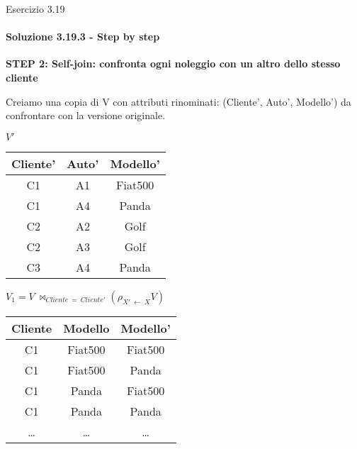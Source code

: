 \begin{frame}{Esercizio 3.19}
    \framesubtitle{Soluzione 3.19.3 - Step by step}
    \vspace*{-1cm}

    {\small \textbf{STEP 2: Self-join: confronta ogni noleggio con un altro dello stesso cliente}}

    Creiamo una copia di V con attributi rinominati: (Cliente', Auto', Modello') da confrontare con la versione originale.
    
    \begin{minipage}{.45\textwidth}
    \centering
    $V'$
    
    \begin{tabular}{|c|c|c|}
    \hline
    \rowcolor{cyan!30} Cliente' & Auto' & Modello' \\
    \hline
    C1 & A1 & Fiat500 \\
    \hline
    C1 & A4 & Panda \\
    \hline
    C2 & A2 & Golf \\
    \hline
    C2 & A3 & Golf \\
    \hline
    C3 & A4 & Panda \\
    \hline
    \end{tabular}
    \end{minipage}%
    \begin{minipage}{.45\textwidth}
    \centering
    \small

    \centering
    
        $V_{1} = V~\bowtie_{Cliente~=~Cliente'} (\rho_{X'~\leftarrow~X} V)$

    \begin{tabular}{|c|c|c|}
    \hline
    \rowcolor{cyan!30} Cliente & Modello & Modello' \\
    \hline
    C1 & Fiat500 & Fiat500 \\
    \hline
    C1 & Fiat500 & Panda \\
    \hline
    C1 & Panda & Fiat500 \\
    \hline
    C1 & Panda & Panda \\
    \hline
    \ldots & \ldots & \ldots \\
    \hline
    \end{tabular}
    \end{minipage}
\end{frame}
%
